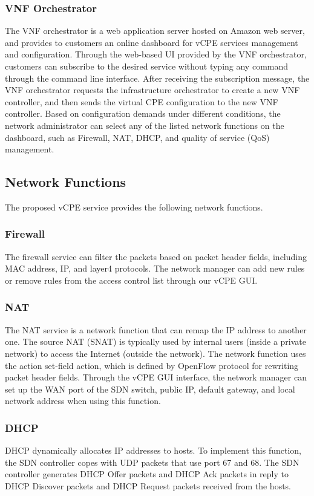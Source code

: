 \documentclass[10pt,journal]{IEEEtran}
\begin{document}
\subsubsection{VNF Orchestrator}
The VNF orchestrator is a web application server hosted on Amazon web server, and provides to customers an online dashboard for vCPE services management and configuration. Through the web-based UI provided by the VNF orchestrator, customers can subscribe to the desired service without typing any command through the command line interface. After receiving the subscription message, the VNF orchestrator requests the infrastructure orchestrator to create a new VNF controller, and then sends the virtual CPE configuration to the new VNF controller. Based on configuration demands under different conditions, the network administrator can select any of the listed network functions on the dashboard, such as Firewall, NAT, DHCP, and quality of service (QoS) management.



\subsection{Network Functions}
The proposed vCPE service provides the following network functions.

\subsubsection{Firewall}
The firewall service can filter the packets based on packet header fields, including MAC address, IP, and layer4 protocols. The network manager can add new rules or remove rules from the access control list through our vCPE GUI.

\subsubsection{NAT}
The NAT service is a network function that can remap the IP address to another one. The source NAT (SNAT) is typically used by internal users (inside a private network) to access the Internet (outside the network). The network function uses the action set-field action, which is defined by OpenFlow protocol for rewriting packet header fields. Through the vCPE GUI interface, the network manager can set up the WAN port of the SDN switch, public IP, default gateway, and local network address when using this function.

\subsubsection{DHCP}
DHCP dynamically allocates IP addresses to hosts.
To implement this function, the SDN controller copes with UDP packets that use port 67 and 68.
The SDN controller generates DHCP Offer packets and DHCP Ack packets in reply to DHCP Discover packets and DHCP Request packets received from the hosts.
\end{document}
